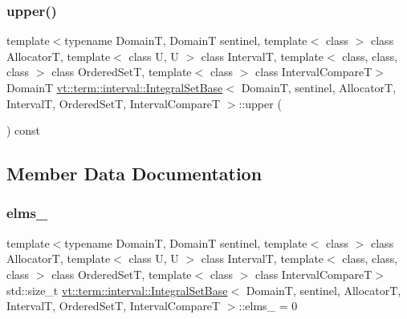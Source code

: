 \mbox{\label{structvt_1_1term_1_1interval_1_1_integral_set_base_a88ef66995c9fd0c1d8ba031dab28da9b}} 
\subsubsection{\texorpdfstring{upper()}{upper()}}
{\footnotesize\ttfamily template$<$typename DomainT, DomainT sentinel, template$<$ class $>$ class AllocatorT, template$<$ class U, U $>$ class IntervalT, template$<$ class, class, class $>$ class Ordered\+SetT, template$<$ class $>$ class Interval\+CompareT$>$ \\
DomainT \hyperlink{structvt_1_1term_1_1interval_1_1_integral_set_base}{vt\+::term\+::interval\+::\+Integral\+Set\+Base}$<$ DomainT, sentinel, AllocatorT, IntervalT, Ordered\+SetT, Interval\+CompareT $>$\+::upper (\begin{DoxyParamCaption}{ }\end{DoxyParamCaption}) const\hspace{0.3cm}{\ttfamily [inline]}}



\subsection{Member Data Documentation}
\mbox{\label{structvt_1_1term_1_1interval_1_1_integral_set_base_a6b6c9d51286b662d28eb1dfac3047af0}} 
\subsubsection{\texorpdfstring{elms\+\_\+}{elms\_}}
{\footnotesize\ttfamily template$<$typename DomainT, DomainT sentinel, template$<$ class $>$ class AllocatorT, template$<$ class U, U $>$ class IntervalT, template$<$ class, class, class $>$ class Ordered\+SetT, template$<$ class $>$ class Interval\+CompareT$>$ \\
std\+::size\+\_\+t \hyperlink{structvt_1_1term_1_1interval_1_1_integral_set_base}{vt\+::term\+::interval\+::\+Integral\+Set\+Base}$<$ DomainT, sentinel, AllocatorT, IntervalT, Ordered\+SetT, Interval\+CompareT $>$\+::elms\+\_\+ = 0\hspace{0.3cm}{\ttfamily [private]}}

